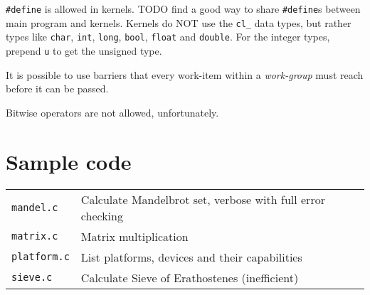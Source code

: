 \documentclass[a4paper,11pt]{article}
\begin{document}
\texttt{\#define} is allowed in kernels. TODO find a good way to share \texttt{\#define}s between main program and kernels. Kernels do NOT use the \texttt{cl\_} data types, but rather types like \texttt{char}, \texttt{int}, \texttt{long}, \texttt{bool}, \texttt{float} and \texttt{double}. For the integer types, prepend \texttt{u} to get the unsigned type.

It is possible to use barriers that every work-item within a \emph{work-group} must reach before it can be passed.

Bitwise operators are not allowed, unfortunately.

\section{Sample code}

\begin{tabular}{|l|l|}
	\hline
		\texttt{mandel.c} & Calculate Mandelbrot set, verbose with full error checking \\
		\texttt{matrix.c} & Matrix multiplication \\
		\texttt{platform.c} & List platforms, devices and their capabilities \\
		\texttt{sieve.c} & Calculate Sieve of Erathostenes (inefficient) \\
	\hline
\end{tabular}
\end{document}
